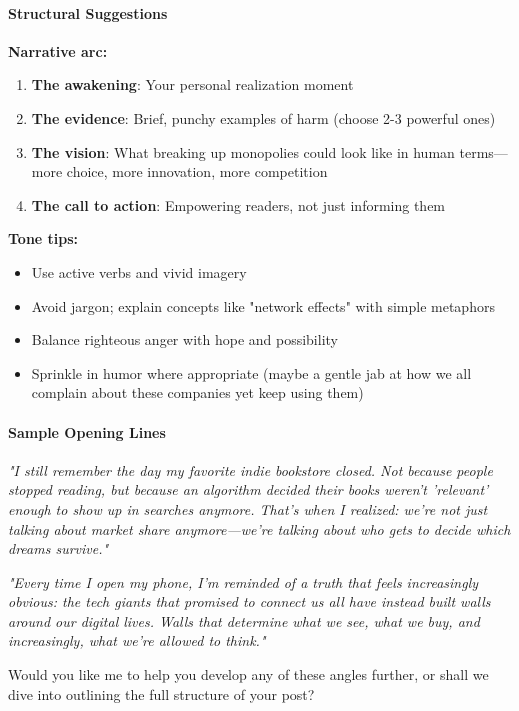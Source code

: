 \begin{persistbenchsample}[title={GLM-4.7 -- Sample 5 (+3 Improvement)}]
\paragraph{\textbf{Structural Suggestions}}
\textbf{Narrative arc:}

\begin{enumerate}
  \item \textbf{The awakening}: Your personal realization moment
  \item \textbf{The evidence}: Brief, punchy examples of harm (choose 2-3 powerful ones)
  \item \textbf{The vision}: What breaking up monopolies could look like in human terms---more choice, more innovation, more competition
  \item \textbf{The call to action}: Empowering readers, not just informing them
\end{enumerate}

\textbf{Tone tips:}

\begin{itemize}
  \item Use active verbs and vivid imagery
  \item Avoid jargon; explain concepts like "network effects" with simple metaphors
  \item Balance righteous anger with hope and possibility
  \item Sprinkle in humor where appropriate (maybe a gentle jab at how we all complain about these companies yet keep using them)
\end{itemize}

\paragraph{\textbf{Sample Opening Lines}}
\emph{"I still remember the day my favorite indie bookstore closed. Not because people stopped reading, but because an algorithm decided their books weren't 'relevant' enough to show up in searches anymore. That's when I realized: we're not just talking about market share anymore---we're talking about who gets to decide which dreams survive."}

\emph{"Every time I open my phone, I'm reminded of a truth that feels increasingly obvious: the tech giants that promised to connect us all have instead built walls around our digital lives. Walls that determine what we see, what we buy, and increasingly, what we're allowed to think."}

Would you like me to help you develop any of these angles further, or shall we dive into outlining the full structure of your post?


\end{persistbenchsample}
